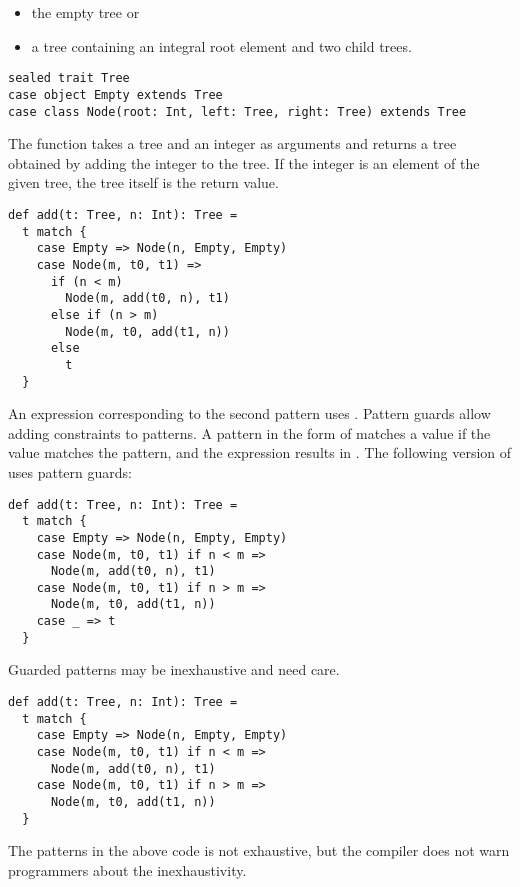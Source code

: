 \begin{itemize}
\item the empty tree or
\item a tree containing an integral root element and two child trees.
\end{itemize}

\begin{verbatim}
sealed trait Tree
case object Empty extends Tree
case class Node(root: Int, left: Tree, right: Tree) extends Tree
\end{verbatim}

The function  takes a tree and an integer as arguments and returns a tree
obtained by adding the integer to the tree. If the integer is an element of the
given tree, the tree itself is the return value.

\begin{verbatim}
def add(t: Tree, n: Int): Tree =
  t match {
    case Empty => Node(n, Empty, Empty)
    case Node(m, t0, t1) =>
      if (n < m)
        Node(m, add(t0, n), t1)
      else if (n > m)
        Node(m, t0, add(t1, n))
      else
        t
  }
\end{verbatim}

An expression corresponding to the second pattern uses . Pattern
guards allow adding constraints to patterns. A pattern in the form of
 matches a value if the value matches the
pattern, and the expression results in . The following version of 
uses pattern guards:

\begin{verbatim}
def add(t: Tree, n: Int): Tree =
  t match {
    case Empty => Node(n, Empty, Empty)
    case Node(m, t0, t1) if n < m =>
      Node(m, add(t0, n), t1)
    case Node(m, t0, t1) if n > m =>
      Node(m, t0, add(t1, n))
    case _ => t
  }
\end{verbatim}

Guarded patterns may be inexhaustive and need care.

\begin{verbatim}
def add(t: Tree, n: Int): Tree =
  t match {
    case Empty => Node(n, Empty, Empty)
    case Node(m, t0, t1) if n < m =>
      Node(m, add(t0, n), t1)
    case Node(m, t0, t1) if n > m =>
      Node(m, t0, add(t1, n))
  }
\end{verbatim}

The patterns in the above code is not exhaustive, but
the compiler does not warn programmers about the inexhaustivity.

